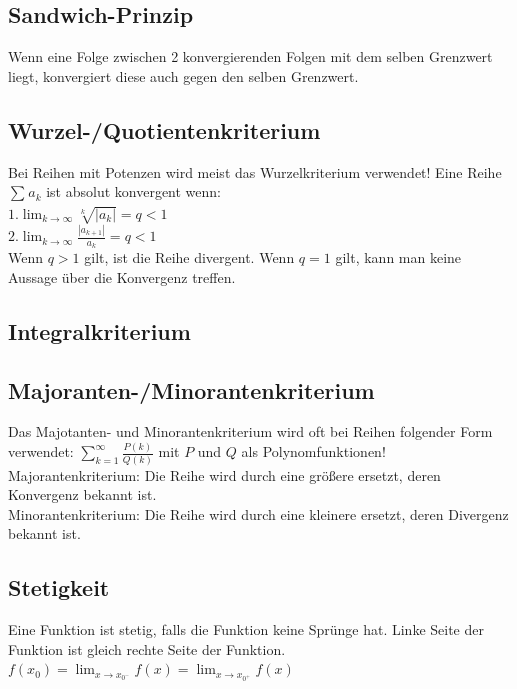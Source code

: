 \documentclass[12pt,a4paper]{article}
\begin{document}
	\subsection{Sandwich-Prinzip}
		Wenn eine Folge zwischen 2 konvergierenden Folgen mit dem selben Grenzwert liegt, konvergiert diese auch gegen den selben Grenzwert.

	\subsection{Wurzel-/Quotientenkriterium}
		Bei Reihen mit Potenzen wird meist das Wurzelkriterium verwendet!\newline
		Eine Reihe $ \sum_{}^{} a_k  $ ist absolut konvergent wenn:\\
		$1. \lim_{k \to \infty} \sqrt[k]{|a_k|}  = q < 1$\\
		$2. \lim_{k \to \infty} \frac{|a_{k+1}|}{a_k}  = q < 1$\\
		Wenn $q > 1$ gilt, ist die Reihe divergent.\newline
		Wenn $q = 1$ gilt, kann man keine Aussage über die Konvergenz treffen.

	\subsection{Integralkriterium}
		

	\subsection{Majoranten-/Minorantenkriterium}
		Das Majotanten- und Minorantenkriterium wird oft bei Reihen folgender Form verwendet:\newline
		$\sum^{\infty}_{k = 1} \frac{P(k)}{Q(k)}$ mit $P$ und $Q$ als Polynomfunktionen!\newline 
		Majorantenkriterium: Die Reihe wird durch eine größere ersetzt, deren Konvergenz bekannt ist.\\
		Minorantenkriterium: Die Reihe wird durch eine kleinere ersetzt, deren Divergenz bekannt ist.

	\subsection{Stetigkeit}
		Eine Funktion ist stetig, falls die Funktion keine Sprünge hat. 
		Linke Seite der Funktion ist gleich rechte Seite der Funktion.\\
		$f(x_0) = \lim_{x \to x_{0^-}} f(x) = \lim_{x \to x_{0^+}} f(x) $ \\
	
\end{document}
